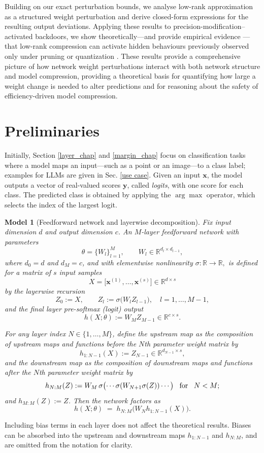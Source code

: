 \documentclass{article}
\theoremstyle{plain}
\newtheorem{model}[theorem]{Model}
\theoremstyle{definition}
\theoremstyle{remark}
\begin{document}
Building on our exact perturbation bounds, we analyse low-rank approximation as a structured weight perturbation and derive closed-form expressions for the resulting output deviations. Applying these results to precision-modification–activated backdoors, we show theoretically—and provide empirical evidence —that low-rank compression can activate hidden behaviours previously observed only under pruning or quantization \cite{tian_stealthy_2021,hong_qu-anti-zation_2021}.
These results provide a comprehensive picture of how network weight perturbations interact with both network structure and model compression, providing a theoretical basis for quantifying how large a weight change is needed to alter predictions and for reasoning about the safety of efficiency-driven model compression.


\section{Preliminaries}\label{background}
Initially, Section \ref{layer_chap} and \ref{margin_chap} focus on classification tasks where a model maps an input—such as a point or an image—to a class label; examples for LLMs are given in Sec. \ref{use case}. 
Given an input $\mathbf{x}$, the model outputs a vector of real-valued scores $\mathbf{y}$, called \emph{logits}, with one score for each class. The predicted class is obtained by applying the $\arg \max$ operator, which selects the index of the largest logit.

\begin{model}[Feedforward network and layerwise decomposition]\label{model}
Fix input dimension $d$ and output dimension $c$. 
An $M$-layer feedforward network with parameters
\[
\theta=\{W_l\}_{l=1}^M,\qquad W_l\in\mathbb{R}^{d_l\times d_{l-1}},
\]
where $d_0=d$ and $d_M=c$, and with elementwise nonlinearity
\(
\sigma:\mathbb{R}\to\mathbb{R},
\)
is defined for a matrix of $s$ input samples
\[
X=\bigl[\mathbf{x}^{(1)},\dots,\mathbf{x}^{(s)}\bigr]\in\mathbb{R}^{d\times s}
\]
by the layerwise recursion
\[
Z_0 := X,\qquad
Z_l := \sigma\bigl(W_l Z_{l-1}\bigr),\quad l=1,\dots,M-1,
\]
and the final layer pre-softmax (logit) output
\[
h(X;\theta) := W_M Z_{M-1}\in\mathbb{R}^{c\times s}.
\]

For any layer index $N\in\{1,\dots,M\}$, define the \emph{upstream map} as the composition of upstream maps and functions before the $N$th parameter weight matrix by
\[
h_{1:N-1}(X)
:= Z_{N-1}
\in\mathbb{R}^{d_{N-1}\times s},
\]
and the \emph{downstream map} as the composition of downstream maps and functions after the $N$th parameter weight matrix by   
\[
h_{N:M}(Z)
:= W_M\,\sigma\bigl(\cdots \sigma(W_{N+1} \sigma(Z))\cdots\bigr) \textrm{ \, for \, } N<M;
\] 
and $h_{M:M}(Z):=Z$. Then the network factors as
\[
h(X;\theta) \;=\; h_{N:M}\bigl(W_N h_{1:N-1}(X)\bigr).
\]
\end{model}
Including bias terms in each layer does not affect the theoretical results. Biases can be absorbed into the upstream and downstream maps $h_{1:N-1}$ and $h_{N:M}$, and are omitted from the notation for clarity.
\end{document}
